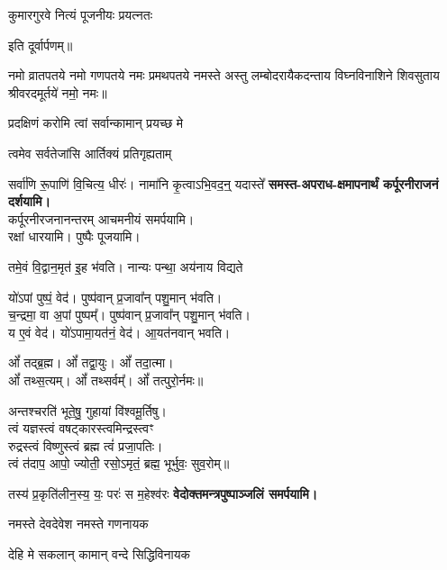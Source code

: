 \begin{center}
{कुमारगुरवे नित्यं पूजनीयः प्रयत्नतः}

इति दूर्वार्पणम्॥

नमो व्रातपतये नमो गणपतये नमः प्रमथपतये नमस्ते अस्तु लम्बोदरायैकदन्ताय विघ्नविनाशिने शिवसुताय श्रीवरदमू‍र्तये॑ नमो॒ नमः॥

{प्रदक्षिणं करोमि त्वां सर्वान्कामान् प्रयच्छ मे}

{त्वमेव सर्वतेजांसि आर्तिक्यं प्रतिगृह्यताम्} 

{सर्वा॑णि रू॒पाणि॑ वि॒चित्य॒ धीरः॑। नामा॑नि कृ॒त्वाऽभि॒वद॒न्॒ यदास्ते᳚}
\textbf{\devAya{} समस्त-अपराध-क्षमापनार्थं कर्पूरनीराजनं दर्शयामि।\\}
कर्पूरनीरजनानन्तरम् आचमनीयं समर्पयामि।\\
रक्षां धारयामि। पुष्पैः पूजयामि।
\medskip

{तमे॒वं वि॒द्वान॒मृत॑ इ॒ह भ॑वति। नान्यः पन्था॒ अय॑नाय विद्यते}

यो॑ऽपां पुष्पं॒ वेद॑। पुष्प॑वान् प्र॒जावा᳚न् पशु॒मान् भ॑वति।\\
च॒न्द्रमा॒ वा अ॒पां पुष्पम्᳚। पुष्प॑वान् प्र॒जावा᳚न् पशु॒मान् भ॑वति।\\
य ए॒वं वेद॑। यो॑ऽपामा॒यत॑नं॒ वेद॑। आ॒यत॑नवान् भवति।\medskip

ओं᳚ तद्ब्र॒ह्म। ओं᳚ तद्वा॒युः। ओं᳚ तदा॒त्मा।\\
ओं᳚ तथ्स॒त्यम्‌। ओं᳚ तथ्सर्वम्᳚‌। ओं᳚ तत्पुरो॒र्नमः॥\medskip

अन्तश्चरति॑ भूते॒षु॒ गुहायां वि॑श्वमू॒र्तिषु।\\
त्वं यज्ञस्त्वं वषट्कारस्त्वमिन्द्रस्त्वꣳ\\
रुद्रस्त्वं विष्णुस्त्वं ब्रह्म त्वं॑ प्रजा॒पतिः।\\
त्वं त॑दाप॒ आपो॒ ज्योती॒ रसो॒ऽमृतं॒ ब्रह्म॒ भूर्भुवः॒ सुव॒रोम्‌॥\medskip

{तस्य॑ प्र॒कृति॑लीन॒स्य॒ यः॒ परः॑ स म॒हेश्व॑रः}
\textbf{\devAya{} वेदोक्तमन्त्रपुष्पाञ्जलिं समर्पयामि।}
\medskip

{नमस्ते देवदेवेश नमस्ते गणनायक} 

{देहि मे सकलान् कामान् वन्दे सिद्धिविनायक} 


\end{center}
